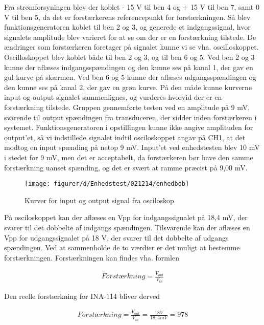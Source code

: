 Fra strømforsyningen blev der koblet - 15 V til ben 4 og + 15 V til ben 7, samt 0 V til ben 5, da det er forstærkerens referencepunkt for forstærkningen.
Så blev funktionsgeneratoren koblet til ben 2 og 3, og generede et indgangssignal, hvor signalets amplitude blev varieret for at se om der er en forstærkning tilstede. 
De ændringer som forstærkeren foretager på signalet kunne vi se vha. oscilloskoppet. 
Oscilloskoppet blev koblet både til ben 2 og 3, og til ben 6 og 5. Ved ben 2 og 3 kunne der aflæses indgangsspændingen og den kunne ses på kanal 1, der gav en gul kurve på skærmen. 
Ved ben 6 og 5 kunne der aflæses udgangsspændingen og den kunne ses på kanal 2, der gav en grøn kurve. 
På den måde kunne kurverne input og output signalet sammenlignes, og vurderes hvorvid der er en forstærkning tilstede.
Gruppen gennemførte testen ved en amplitude på 9 mV, svarende til output spændingen fra transduceren, der sidder inden forstærkeren i systemet. 
Funktionsgeneratoren i opstillingen kunne ikke angive amplituden for output'et, så vi indstillede signalet indtil osciloskoppet angav på CH1, at det modtog en input spænding på netop 9 mV. 
Input'et ved enhedstesten blev 10 mV i stedet for 9 mV, men det er acceptabelt, da forstærkeren bør have den samme forstærkning uanset spænding, og det er svært at ramme præcist på 9,00 mV.

\begin{figure}[H]
    \centering
    \texttt{[image: figurer/d/Enhedstest/021214/enhedbob]}
    \caption{Kurver for input og output signal fra osciloskop}
    \label{figtest_forstaerker}
\end{figure}

På osciloskoppet kan der aflæses en Vpp for indgangssignalet på 18,4 mV, der svarer til det dobbelte af indgangs spændingen. 
Tilsvarende kan der aflæses en Vpp for udgangssignalet på 18 V, der svarer til det dobbelte af udgangs spændingen. 
Ved at sammenholde de to værdier er det muligt at bestemme forstærkningen.
Forstærkningen kan findes vha. formlen

\begin{align}
Forstærkning = \frac{V_{out}}{V_{in}}
\end{align}

Den reelle forstærkning for INA-114 bliver derved

\begin{align}
Forstærkning = \frac{V_{out}}{V_{in}} = \frac{18 V}{18,4 mV} = 978 
\end{align}

